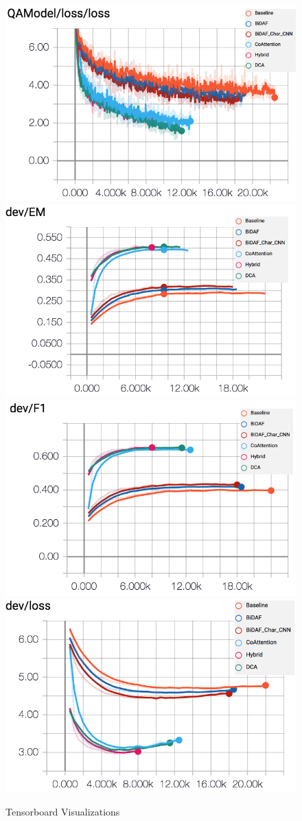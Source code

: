 \documentclass{article} %
\begin{document}

\begin{figure}[htp]
\centering
\includegraphics[width=.5\textwidth]{figures/t1.png}\hfill
\includegraphics[width=.5\textwidth]{figures/t2.png}\hfill
\includegraphics[width=.5\textwidth]{figures/t3.png}\hfill
\includegraphics[width=.5\textwidth]{figures/t4.png}\hfill
\caption{Tensorboard Visualizations}
\label{tensorboard}
\end{figure}
\end{document}
